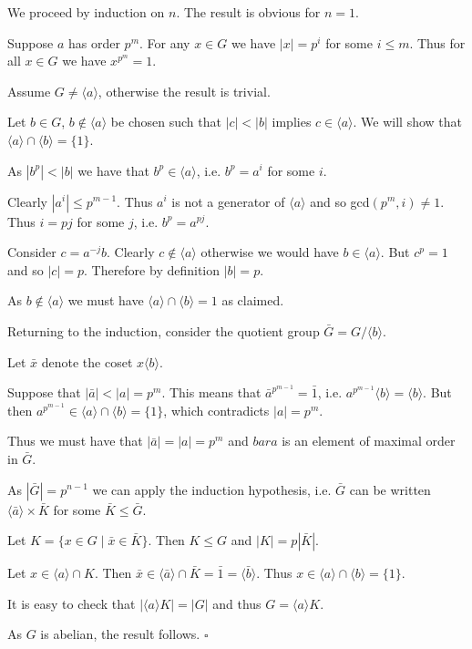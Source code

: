\documentclass[10pt]{article}
\newenvironment{proof}[1][Proof]{\begin{trivlist}
\item[\hskip \labelsep {\itshape #1}]}{\end{trivlist}}
\begin{document}
\begin{proof}
We proceed by induction on $n$. The result is obvious for $n = 1$.

Suppose $a$ has order $p^m$. For any $x \in G$ we have $|x| = p^i$ for some $i \leq m$. Thus for all $x \in G$ we have $x^{p^m} = 1$.

Assume $G \neq \langle a \rangle$, otherwise the result is trivial.

Let $b \in G$, $b \notin \langle a \rangle$ be chosen such that $|c| < |b|$ implies $c \in \langle a \rangle$. We will show that $\langle a \rangle \cap \langle b \rangle = \{1\}$.

As $|b^p| < |b|$ we have that $b^p \in \langle a \rangle$, i.e. $b^p = a^i$ for some $i$.

Clearly $|a^i| \leq p^{m-1}$. Thus $a^i$ is not a generator of $\langle a \rangle$ and so gcd$(p^m, i) \neq 1$. Thus $i = pj$ for some $j$, i.e. $b^p = a^{pj}$.

Consider $c = a^{-j}b$. Clearly $c \notin \langle a \rangle$ otherwise we would have $b \in \langle a \rangle$. But $c^p = 1$ and so $|c| = p$. Therefore by definition $|b| = p$.

As $b \notin \langle a \rangle$ we must have $\langle a \rangle \cap \langle b \rangle = 1$ as claimed.

Returning to the induction, consider the quotient group $\bar{G} = G/\langle b \rangle$.

Let $\bar{x}$ denote the coset $x\langle b \rangle$.

Suppose that $|\bar{a}| < |a| = p^m$. This means that $\bar{a}^{p^{m-1}} = \bar{1}$, i.e. $a^{p^{m-1}}\langle b \rangle = \langle b \rangle$. But then $a^{p^{m-1}} \in \langle a \rangle \cap \langle b \rangle = \{1\}$, which contradicts $|a| = p^m$.

Thus we must have that $|\bar{a}| = |a| = p^m$ and $bar{a}$ is an element of maximal order in $\bar{G}$.

As $|\bar{G}| = p^{n-1}$ we can apply the induction hypothesis, i.e. $\bar{G}$ can be written $\langle \bar{a} \rangle\times \bar{K}$ for some $\bar{K} \leq \bar{G}$.

Let $K = \{x \in G \;|\; \bar{x} \in \bar{K}\}$. Then $K \leq G$ and $|K| = p|\bar{K}|$.

Let $x \in \langle a \rangle \cap K$. Then $\bar{x} \in \langle \bar{a} \rangle \cap \bar{K} = \bar{1} = \langle \bar{b} \rangle$. Thus $x \in \langle a \rangle \cap \langle b \rangle = \{1\}$.

It is easy to check that $|\langle a \rangle K| = |G|$ and thus $G = \langle a \rangle K$.

As $G$ is abelian, the result follows. $\square$
\end{proof}
\end{document}
